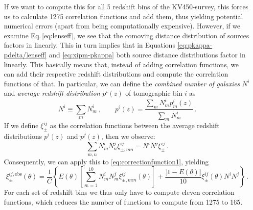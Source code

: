 \documentclass[referee]{aa} %
\renewcommand{\[}{\begin{equation}}
\renewcommand{\]}{\end{equation}}
\renewcommand{\rm}{\mathrm}
\begin{document}
If we want to compute this for all 5 redshift bins of the KV450-survey, this forces us to calculate 1275 correlation functions and add them, thus yielding potential numerical errors (apart from being computationally expensive). However, if we examine Eq.\,\eqref{eq:lenseff}, we see that the comoving distance distribution of sources factors in linearly. This in turn implies that in Equations \eqref{eq:pkappa-pdelta/lenseff} and \eqref{eq:xipm-pkappa} both source distance distributions factor in linearly. This basically means that, instead of adding correlation functions, we can add their respective redshift distributions and compute the correlation functions of that. In particular, we can define the \textit{combined number of galaxies} $N^i$ and \textit{average redshift distribution} $p^i(z)$ of tomographic bin $i$ as \[
N^i\equiv\sum_m N_m^i\, , \qquad p^i(z) = \frac{\sum_m N_m^i p_m^i(z)}{\sum_m N_m^i} \, .
\]
If we define $\xi^{ij}_\pm$ as the correlation functions between the average redshift distributions $p^i(z)$ and $p^j(z)$, then we observe: \[
\sum_{m,n}N_m^iN_n^j\xi^{ij}_{\pm,mn} = N^iN^j\xi^{ij}_\pm\, .
\]
Consequently, we can apply this to \eqref{eq:correctionfunction1}, yielding
\begin{equation}
\xi_{\pm}^{ij,\rm{obs}}(\theta) = \frac{1}{C}\left\{ E(\theta)\left[\sum_{m=1}^{10} N_m^iN_m^j \xi_{\pm,mm}^{ij}(\theta)\right] +\frac{\big[1-E(\theta)\big]}{10}\xi_\pm^{ij}(\theta)N^iN^j\right\}\, .
\label{eq:correctionfunction2}
\end{equation}
For each set of redshift bins we thus only have to compute eleven correlation functions, which reduces the number of functions to compute from 1275 to 165.

\end{document}

